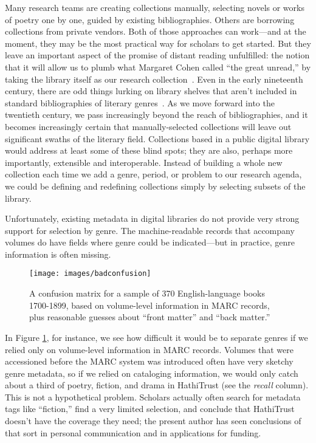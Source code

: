 \documentclass[paper=a4, fontsize=12pt]{scrartcl}
\numberwithin{equation}{section}		%
\numberwithin{figure}{section}			%
\numberwithin{table}{section}				%
\begin{document}
Many research teams are creating collections manually, selecting novels or works of poetry one by one, guided by existing bibliographies. Others are borrowing collections from private vendors. Both of those approaches can work---and at the moment, they may be the most practical way for scholars to get started. But they leave an important aspect of the promise of distant reading unfulfilled: the notion that it will allow us to plumb what Margaret Cohen called ``the great unread,'' by taking the library itself as our research collection~\cite{cohen:unread, moretti:world}. Even in the early nineteenth century, there are odd things lurking on library shelves that aren't included in standard bibliographies of literary genres~\cite{underwood:blurry}. As we move forward into the twentieth century, we pass increasingly beyond the reach of bibliographies, and it becomes increasingly certain that manually-selected collections will leave out significant swaths of the literary field. Collections based in a public digital library would address at least some of these blind spots; they are also, perhaps more importantly, extensible and interoperable. Instead of building a whole new collection each time we add a genre, period, or problem to our research agenda, we could be defining and redefining collections simply by selecting subsets of the library.

Unfortunately, existing metadata in digital libraries do not provide very strong support for selection by genre. The machine-readable records that accompany volumes do have fields where genre could be indicated---but in practice, genre information is often missing.

\begin{figure}[!h]
\centering
\texttt{[image: images/badconfusion]}
\caption{A confusion matrix for a sample of 370 English-language books 1700-1899, based on volume-level information in MARC records, plus reasonable guesses about ``front matter'' and ``back matter.''}
\label{badconfusion}
\end{figure}
\FloatBarrier

In Figure \ref{badconfusion}, for instance, we see how difficult it would be to separate genres if we relied only on volume-level information in MARC records. Volumes that were accessioned before the MARC system was introduced often have very sketchy genre metadata, so if we relied on cataloging information, we would only catch about a third of poetry, fiction, and drama in HathiTrust (see the \textit{recall} column). This is not a hypothetical problem. Scholars actually often search for metadata tags like ``fiction,'' find a very limited selection, and conclude that HathiTrust doesn't have the coverage they need; the present author has seen conclusions of that sort in personal communication and in applications for funding.
\end{document}
